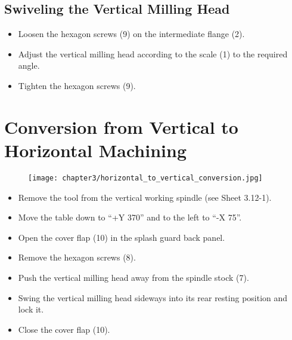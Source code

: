 \vspace{0.3cm}

\subsection{Swiveling the Vertical Milling Head}

\begin{itemize}
    \item Loosen the hexagon screws (9) on the intermediate flange (2).
    \item Adjust the vertical milling head according to the scale (1) to the required angle.
    \item Tighten the hexagon screws (9).
\end{itemize}


\vspace{0.3cm}


\section{Conversion from Vertical to Horizontal Machining}

\begin{figure}[h]
    \centering
    \texttt{[image: chapter3/horizontal\_to\_vertical\_conversion.jpg]}
    \label{fig:vertical_to_horizontal_conversion}
\end{figure}

\begin{itemize}
    \item Remove the tool from the vertical working spindle (see Sheet 3.12-1).
    \item Move the table down to \enquote{+Y 370} and to the left to \enquote{-X 75}.\footnotemark
    \item Open the cover flap (10) in the splash guard back panel.
    \item Remove the hexagon screws (8).
    \item Push the vertical milling head away from the spindle stock (7).
    \item Swing the vertical milling head sideways into its rear resting position and lock it.
    \item Close the cover flap (10).
\end{itemize}

